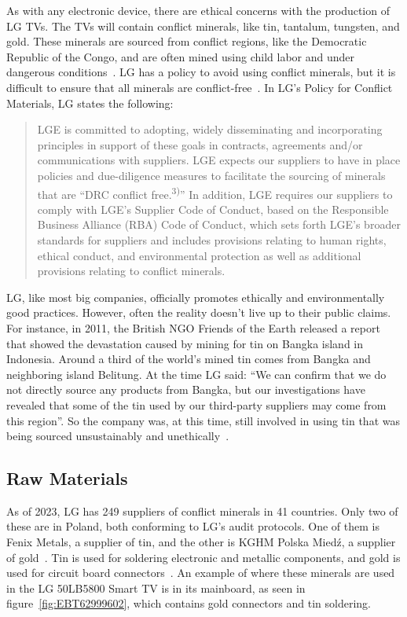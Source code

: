 \documentclass[12pt, letterpaper]{article}
\begin{document}
As with any electronic device, there are ethical concerns with the
production of LG TVs. The TVs will contain conflict minerals, like
tin, tantalum, tungsten, and gold. These minerals are sourced from
conflict regions, like the Democratic
Republic of the Congo, and are often mined using child labor and
under dangerous conditions~\autocite{hower-2013}. LG has a policy to
avoid using conflict
minerals, but it is difficult to ensure that all minerals are
conflict-free~\autocite{lg-electronics-no-dateA}. In LG's Policy for
Conflict Materials, LG states the following:

\begin{quote}
  LGE is committed to adopting, widely disseminating and incorporating
  principles in support of these goals in contracts, agreements and/or
  communications with suppliers. LGE expects our suppliers to have in
  place policies and due-diligence measures to facilitate the sourcing
of minerals that are ``DRC conflict free.\textsuperscript{3)}'' In
addition, LGE requires
our suppliers to comply with LGE's Supplier Code of Conduct, based on
the Responsible Business Alliance (RBA) Code of Conduct, which sets
forth LGE's broader standards for suppliers and includes provisions
relating to human rights, ethical conduct, and environmental
protection as well as additional provisions relating to conflict minerals.
\end{quote}

LG, like most big companies, officially promotes ethically and
environmentally good practices. However, often the reality doesn't
live up to their public claims. For instance, in 2011, the British
NGO Friends of the Earth released a report that showed the
devastation caused by mining for tin on Bangka island in Indonesia.
Around a third of the world's mined tin comes from Bangka and
neighboring island Belitung. At the time LG said: ``We can confirm
that we do not directly source any products from Bangka, but our
investigations have revealed that some of the tin used by our
third-party suppliers may come from this region''. So the company
was, at this time, still involved in using tin that was being sourced
unsustainably and unethically~\autocite{hower-2013}.

\subsection{Raw Materials}

As of 2023, LG has 249 suppliers of conflict minerals in 41
countries. Only two of these are in Poland, both conforming to LG's
audit protocols. One of them is Fenix Metals, a supplier of tin, and
the other is KGHM Polska Mied\'z, a supplier of
gold~\autocite{lg-electronics-2023}. Tin is used for soldering
electronic and metallic components, and gold is used for circuit
board connectors~\autocite{brigham-2023}. An example of where these
minerals are used in the LG 50LB5800 Smart TV is in its mainboard, as
seen in figure~\ref{fig:EBT62999602}, which contains gold connectors
and tin soldering.
\end{document}

